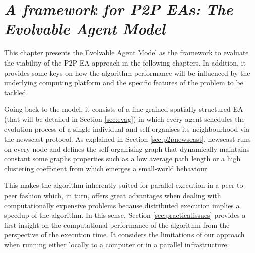 

\chapter{\textit{A framework for P2P EAs: The Evolvable Agent Model}}
\label{cap:model}



This chapter presents the Evolvable Agent Model as the framework to evaluate the viability of the P2P EA approach in the following chapters. In addition, it provides some keys on how the algorithm performance will be influenced by the underlying computing platform and the specific features of the problem to be tackled.

Going back to the model, it consists of a fine-grained spatially-structured EA (that will be detailed in Section \ref{sec:evag}) in which every agent schedules the evolution process of a single individual and self-organises its neighbourhood via the newscast protocol. As explained in Section \ref{sec:p2pnewscast}, newscast runs on every node and defines the self-organising graph  that dynamically maintains constant some graphs properties such as a low average path length or a high clustering coefficient from which emerges a small-world behaviour.


This makes the algorithm inherently suited for parallel execution in a
peer-to-peer fashion which, in turn, offers great advantages when
dealing with computationally expensive problems because distributed
execution implies a speedup of the algorithm. In this sense, Section \ref{sec:practicalissues} provides a first insight on the computational performance of the algorithm from the perspective of the execution time. It considers the limitations of our approach when running either locally to a computer or in a parallel infrastructure:

